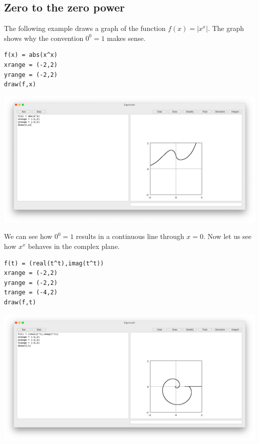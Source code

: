 
\subsection{Zero to the zero power}
The following example draws a graph of the function $f(x)=|x^x|$.
The graph shows why the convention $0^0=1$ makes sense.

\begin{Verbatim}[formatcom=\color{blue},samepage=true]
f(x) = abs(x^x)
xrange = (-2,2)
yrange = (-2,2)
draw(f,x)
\end{Verbatim}

\begin{center}
\includegraphics[scale=0.2]{zerozero.png}
\end{center}

We can see how $0^0=1$ results in a continuous line through $x=0$.
Now let us see how $x^x$ behaves in the complex plane.

\begin{Verbatim}[formatcom=\color{blue},samepage=true]
f(t) = (real(t^t),imag(t^t))
xrange = (-2,2)
yrange = (-2,2)
trange = (-4,2)
draw(f,t)
\end{Verbatim}

\begin{center}
\includegraphics[scale=0.2]{zerozero2.png}
\end{center}
